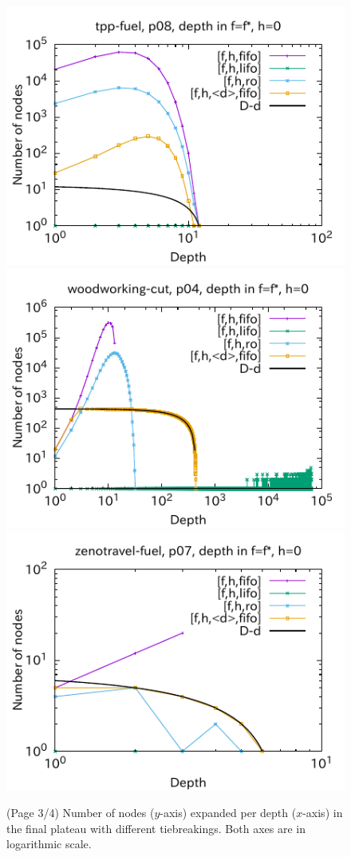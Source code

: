 \begin{figure}[htbp]
\includegraphics{img/output-lmcut/tpp-fuel/p08.pdf}
\includegraphics{img/output-lmcut/woodworking-cut/p04.pdf}
\includegraphics{img/output-lmcut/zenotravel-fuel/p07.pdf}
 \caption{(Page 3/4) Number of nodes ($y$-axis) expanded per depth ($x$-axis) in
 the final plateau with different tiebreakings. Both axes are in logarithmic scale.
 }
 \label{fig:depth-histogram3}
\end{figure}

